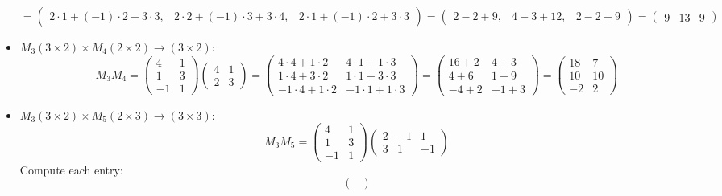 \documentclass{article}
\begin{document}
\begin{itemize}
\[    = \begin{pmatrix}
        2 \cdot 1 + (-1) \cdot 2 + 3 \cdot 3, &
        2 \cdot 2 + (-1) \cdot 3 + 3 \cdot 4, &
        2 \cdot 1 + (-1) \cdot 2 + 3 \cdot 3
    \end{pmatrix}
    = \begin{pmatrix}
        2 - 2 + 9, & 4 - 3 + 12, & 2 - 2 + 9
    \end{pmatrix}
    = \begin{pmatrix}
        9 & 13 & 9
    \end{pmatrix}
    \]
    \item \( M_3 (3 \times 2) \times M_4 (2 \times 2) \to (3 \times 2) \):
    \[
    M_3 M_4 = \begin{pmatrix} 4 & 1 \\ 1 & 3 \\ -1 & 1 \end{pmatrix} \begin{pmatrix} 4 & 1 \\ 2 & 3 \end{pmatrix}
    = \begin{pmatrix}
        4 \cdot 4 + 1 \cdot 2 & 4 \cdot 1 + 1 \cdot 3 \\
        1 \cdot 4 + 3 \cdot 2 & 1 \cdot 1 + 3 \cdot 3 \\
        -1 \cdot 4 + 1 \cdot 2 & -1 \cdot 1 + 1 \cdot 3
    \end{pmatrix}
    = \begin{pmatrix}
        16 + 2 & 4 + 3 \\
        4 + 6 & 1 + 9 \\
        -4 + 2 & -1 + 3
    \end{pmatrix}
    = \begin{pmatrix}
        18 & 7 \\
        10 & 10 \\
        -2 & 2
    \end{pmatrix}
    \]
    \item \( M_3 (3 \times 2) \times M_5 (2 \times 3) \to (3 \times 3) \):
    \[
    M_3 M_5 = \begin{pmatrix} 4 & 1 \\ 1 & 3 \\ -1 & 1 \end{pmatrix} \begin{pmatrix} 2 & -1 & 1 \\ 3 & 1 & -1 \end{pmatrix}
    \]
    Compute each entry:
    \[
    \begin{pmatrix}

\end{pmatrix}\]
\end{itemize}
\end{document}
